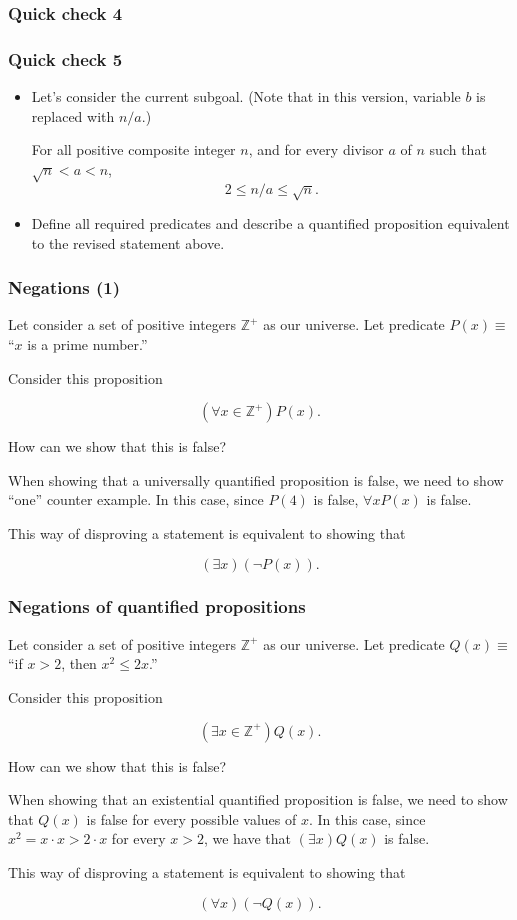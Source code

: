 \begin{frame}\frametitle{Quick check 4}
\end{frame}

\begin{frame}\frametitle{Quick check 5}
  \begin{itemize}
  \item Let's consider the current subgoal.  (Note that in this
    version, variable $b$ is replaced with $n/a$.)
    
    \begin{tcolorbox}[title=Another revised statement]
      For all positive composite integer $n$, and for every divisor
      $a$ of $n$ such that $\sqrt{n} < a < n$,
      \[ 2\leq n/a \leq\sqrt{n}.\]
    \end{tcolorbox}

  \item Define all required predicates and describe a quantified
    proposition equivalent to the revised statement above.

    \vspace{1in}
    
  \end{itemize}
\end{frame}

\begin{frame}\frametitle{Negations (1)}
  Let consider a set of positive integers $\mathbb Z^+$ as our
  universe.  Let predicate $P(x)\equiv$ ``$x$ is a prime number.''

  Consider this proposition

  \[(\forall x\in {\mathbb Z^+}) P(x).\]

  How can we show that this is false? \pause

  When showing that a universally quantified proposition is false, we
  need to show ``one'' counter example.  In this case, since $P(4)$ is
  false, $\forall x P(x)$ is false.  \pause

  This way of disproving a statement is equivalent to showing that

  \[(\exists x)(\neg P(x)).\]
\end{frame}

\begin{frame}\frametitle{Negations of quantified propositions}
  Let consider a set of positive integers $\mathbb Z^+$ as our
  universe.  Let predicate $Q(x)\equiv$ ``if $x > 2$, then  $x^2\leq 2x$.''

  Consider this proposition

  \[(\exists x\in {\mathbb Z^+}) Q(x).\]

  How can we show that this is false? \pause

  When showing that an existential quantified proposition is false, we
  need to show that $Q(x)$ is false for every possible values of $x$.
  In this case, since $x^2 = x\cdot x > 2\cdot x$ for every $x>2$, we
  have that $(\exists x) Q(x)$ is false. \pause

  This way of disproving a statement is equivalent to showing that

  \[(\forall x)(\neg Q(x)).\]
\end{frame}

